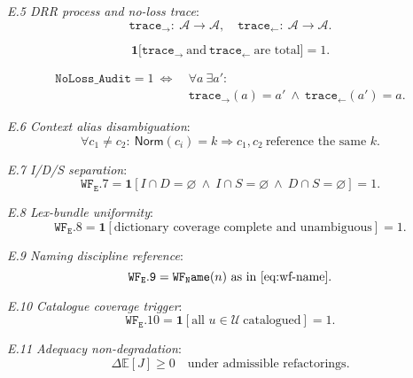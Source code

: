 \documentclass[conference]{IEEEtran}
\begin{document}
\noindent\emph{E.5 DRR process and no-loss trace}:
\begin{equation}\label{eq:e5a}
\mathtt{trace}_{\rightarrow}:\ \mathcal{A}\to \mathcal{A},\quad
\mathtt{trace}_{\leftarrow}:\ \mathcal{A}\to \mathcal{A}.
\end{equation}

\begin{equation}\label{eq:e5b}
\mathbf{1}\big[\mathtt{trace}_{\rightarrow}\ \text{and}\ \mathtt{trace}_{\leftarrow}\ \text{are total}\big]=1.
\end{equation}

\begin{equation}\label{eq:e5c}
\begin{aligned}
\mathtt{NoLoss\_Audit}=1\ \Leftrightarrow\ 
&\forall a\ \exists a':\\
&\mathtt{trace}_{\rightarrow}(a)=a'\ \wedge\ \mathtt{trace}_{\leftarrow}(a')=a.
\end{aligned}
\end{equation}

\noindent\emph{E.6 Context alias disambiguation}:
\begin{equation}
\label{eq:e6}
\forall c_1\neq c_2:\ \mathsf{Norm}(c_i)=k\Rightarrow c_1,c_2\ \text{reference the same }k.
\end{equation}

\noindent\emph{E.7 I/D/S separation}:
\begin{equation}
\label{eq:e7}
\mathtt{WF_E.7}=\mathbf{1}[I\cap D=\varnothing\ \wedge\ I\cap S=\varnothing\ \wedge\ D\cap S=\varnothing]=1.
\end{equation}

\noindent\emph{E.8 Lex-bundle uniformity}:
\begin{equation}
\label{eq:e8}
\mathtt{WF_E.8}=\mathbf{1}[\text{dictionary coverage complete and unambiguous}]=1.
\end{equation}

\noindent\emph{E.9 Naming discipline reference}:
\begin{equation}
\label{eq:e9}
\mathtt{WF_E.9}=\mathtt{WF_Name}(n)\ \text{as in \eqref{eq:wf-name}}.
\end{equation}

\noindent\emph{E.10 Catalogue coverage trigger}:
\begin{equation}
\label{eq:e10}
\mathtt{WF_E.10}=\mathbf{1}[\text{all }u\in\mathcal{U}\ \text{catalogued}]=1.
\end{equation}

\noindent\emph{E.11 Adequacy non-degradation}:
\begin{equation}
\label{eq:e11}
\Delta\mathbb{E}[J]\ge 0\quad\text{under admissible refactorings}.
\end{equation}
\end{document}
